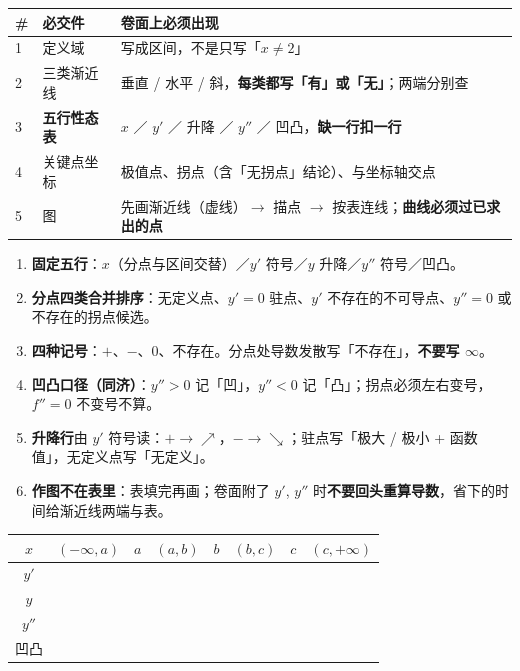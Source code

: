 \documentclass[11pt,a4paper]{ctexart}
\begin{document}
\begin{center}\footnotesize
\begin{tabular}{@{}p{0.9cm}p{3.0cm}p{10.7cm}@{}}
\toprule
\textbf{\#} & \textbf{必交件} & \textbf{卷面上必须出现} \\
\midrule
1 & 定义域 & 写成区间，不是只写「$x\ne2$」 \\
2 & 三类渐近线 & 垂直 / 水平 / 斜，\textbf{每类都写「有」或「无」}；两端分别查 \\
3 & \textbf{五行性态表} & $x$ ／ $y'$ ／ 升降 ／ $y''$ ／ 凹凸，\textbf{缺一行扣一行} \\
4 & 关键点坐标 & 极值点、拐点（含「无拐点」结论）、与坐标轴交点 \\
5 & 图 & 先画渐近线（虚线）$\to$ 描点 $\to$ 按表连线；\textbf{曲线必须过已求出的点} \\
\bottomrule
\end{tabular}
\end{center}

\begin{warnbox}
\begin{enumerate}[leftmargin=1.8em,itemsep=1pt]
\item \textbf{固定五行}：$x$（分点与区间交替）／$y'$ 符号／$y$ 升降／$y''$ 符号／凹凸。
\item \textbf{分点四类合并排序}：无定义点、$y'=0$ 驻点、$y'$ 不存在的不可导点、$y''=0$ 或不存在的拐点候选。
\item \textbf{四种记号}：$+$、$-$、$0$、不存在。分点处导数发散写「不存在」，\textbf{不要写 $\infty$}。
\item \textbf{凹凸口径（同济）}：$y''>0$ 记「凹」，$y''<0$ 记「凸」；拐点必须左右变号，$f''=0$ 不变号不算。
\item \textbf{升降行}由 $y'$ 符号读：$+\to\nearrow$，$-\to\searrow$；驻点写「极大 / 极小 + 函数值」，无定义点写「无定义」。
\item \textbf{作图不在表里}：表填完再画；卷面附了 $y'$, $y''$ 时\textbf{不要回头重算导数}，省下的时间给渐近线两端与表。
\end{enumerate}
\end{warnbox}


\begin{center}
\footnotesize\setlength{\tabcolsep}{4pt}
\begin{tabular}{@{}c|ccccccc@{}}
$x$ & $(-\infty,a)$ & $a$ & $(a,b)$ & $b$ & $(b,c)$ & $c$ & $(c,+\infty)$ \\
\hline
$y'$ & & & & & & & \\
$y$ & & & & & & & \\
$y''$ & & & & & & & \\
凹凸 & & & & & & & \\
\end{tabular}
\end{center}
\end{document}
